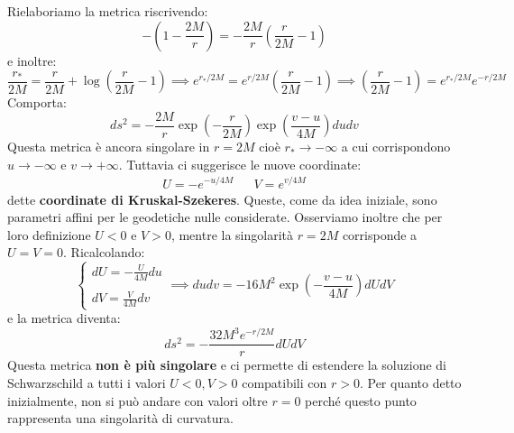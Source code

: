 Rielaboriamo la metrica riscrivendo:
\begin{equation*}
    -\left( 1 - \frac{2M}{r}\right) = - \frac{2M}{r}\left( \frac{r}{2M}-1\right)
\end{equation*}
e inoltre:
\begin{equation*}
    \frac{r_*}{2M} = \frac{r}{2M}+\log(\frac{r}{2M}-1) \implies e^{r_*/2M} = e^{r/2M}\left(\frac{r}{2M}-1\right) \implies \left(\frac{r}{2M}-1\right) =  e^{r_*/2M} e^{-r/2M}
\end{equation*}
Comporta:
\begin{equation*}
    ds^2 = - \frac{2M}{r}\exp({-\frac{r}{2M}}) \exp({\frac{v-u}{4M}})dudv
\end{equation*}
Questa metrica è ancora singolare in $r=2M$ cioè $r_*\rightarrow-\infty$ a cui corrispondono $u\rightarrow -\infty$ e $v \rightarrow +\infty$. Tuttavia ci suggerisce le nuove coordinate:
\begin{align}
    U= - e^{-u/4M} && V= e^{v/4M}
\end{align}
dette \textbf{coordinate di Kruskal-Szekeres}. Queste, come da idea iniziale, sono parametri affini per le geodetiche nulle considerate. Osserviamo inoltre che per loro definizione $U<0$ e $V>0$, mentre la singolarità $r=2M$ corrisponde a $U=V=0$. 
Ricalcolando:
\begin{equation*}
    \left\{\begin{array}{l}
    dU = -\frac{U}{4M}du \\ \\
    dV = \frac{V}{4M}dv
    \end{array}\right.  \implies dudv = - 16M^2 \exp{(-\frac{v-u}{4M})}dUdV
\end{equation*}
e la metrica diventa:
\begin{equation}
    ds^2 = -\frac{32M^3 e^{-r/2M}}{r}dUdV
    \label{eq.metrica_kruskal_UV}
\end{equation}
Questa metrica \textbf{non è più singolare} e ci permette di estendere la soluzione di Schwarzschild a tutti i valori $U<0, V>0$ compatibili con $r>0$. Per quanto detto inizialmente, non si può andare con valori oltre $r=0$ perché questo punto rappresenta una singolarità di curvatura.

